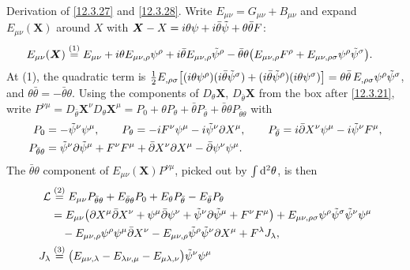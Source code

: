 \begin{tcolorbox}[breakable]
	\begin{remark}
		Derivation of \eqref{12.3.27} and \eqref{12.3.28}. Write $E_{\mu\nu}=G_{\mu\nu}+B_{\mu\nu}$ and expand $E_{\mu\nu}(\bm X)$ around $X$ with $\bm X-X=i\theta\psi+i\bar\theta\tilde\psi+\theta\bar\theta F$:
		\begin{align*}
			E_{\mu\nu}(\bm X)&\overset{(1)}{=} E_{\mu\nu}+i\theta E_{\mu\nu,\rho}\psi^{\rho}+i\bar\theta E_{\mu\nu,\rho}\tilde\psi^{\rho}
			-\bar\theta\theta\bigl(E_{\mu\nu,\rho}F^{\rho}+E_{\mu\nu,\rho\sigma}\psi^{\rho}\tilde\psi^{\sigma}\bigr) .
		\end{align*}
		At (1), the quadratic term is $\frac12E_{,\rho\sigma}\bigl[(i\theta\psi^{\rho})(i\bar\theta\tilde\psi^{\sigma})+(i\bar\theta\tilde\psi^{\rho})(i\theta\psi^{\sigma})\bigr]=\theta\bar\theta\,E_{,\rho\sigma}\psi^{\rho}\tilde\psi^{\sigma}$, and $\theta\bar\theta=-\bar\theta\theta$. Using the components of $D_{\theta}\bm X$, $D_{\bar\theta}\bm X$ from the box after \eqref{12.3.21}, write $P^{\nu\mu}=D_{\bar\theta}\bm X^{\nu}D_{\theta}\bm X^{\mu}=P_{0}+\theta P_{\theta}+\bar\theta P_{\bar\theta}+\bar\theta\theta P_{\bar\theta\theta}$ with
		\begin{align*}
			P_{0}&=-\tilde\psi^{\nu}\psi^{\mu},\qquad
			P_{\theta}=-i F^{\nu}\psi^{\mu}-i\tilde\psi^{\nu}\partial X^{\mu},\qquad
			P_{\bar\theta}=i\bar\partial X^{\nu}\psi^{\mu}-i\tilde\psi^{\nu}F^{\mu},\\
			P_{\bar\theta\theta}&=\tilde\psi^{\nu}\partial\tilde\psi^{\mu}+F^{\nu}F^{\mu}+\bar\partial X^{\nu}\partial X^{\mu}-\bar\partial\psi^{\nu}\psi^{\mu} .
		\end{align*}
		The $\bar\theta\theta$ component of $E_{\mu\nu}(\bm X)P^{\nu\mu}$, picked out by $\int\mathrm{d}^{2}\theta$, is then
		\begin{align*}
			\mathcal L&\eqs{2} E_{\mu\nu}P_{\bar\theta\theta}+E_{\bar\theta\theta}P_{0}+E_{\theta}P_{\bar\theta}-E_{\bar\theta}P_{\theta}\\
			&= E_{\mu\nu}\bigl(\partial X^{\mu}\bar\partial X^{\nu}+\psi^{\mu}\bar\partial\psi^{\nu}+\tilde\psi^{\nu}\partial\tilde\psi^{\mu}+F^{\nu}F^{\mu}\bigr)
			+E_{\mu\nu,\rho\sigma}\psi^{\rho}\tilde\psi^{\sigma}\tilde\psi^{\nu}\psi^{\mu}\\
			&\quad -E_{\mu\nu,\rho}\psi^{\rho}\psi^{\mu}\bar\partial X^{\nu}-E_{\mu\nu,\rho}\tilde\psi^{\rho}\tilde\psi^{\nu}\partial X^{\mu}+F^{\lambda}J_{\lambda} ,\\
			J_{\lambda}&\eqs{3} \bigl(E_{\mu\nu,\lambda}-E_{\lambda\nu,\mu}-E_{\mu\lambda,\nu}\bigr)\tilde\psi^{\nu}\psi^{\mu}

\end{align*}
\end{remark}
\end{tcolorbox}

